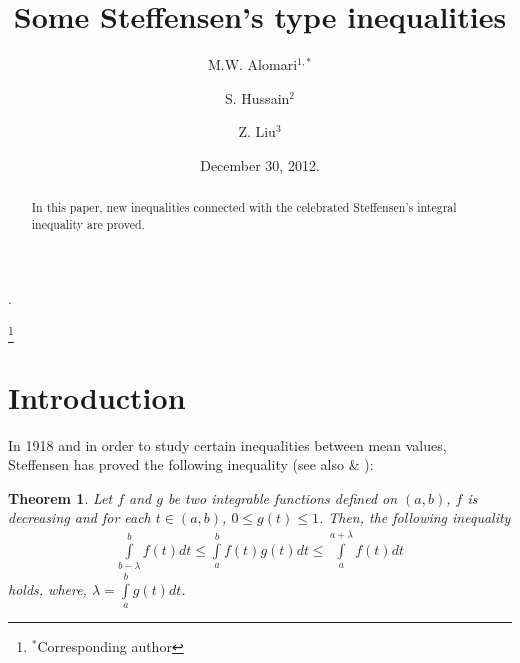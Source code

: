 \documentclass{amsart}
\newtheorem{theorem}{Theorem}
\theoremstyle{plain}
\numberwithin{equation}{section}
\begin{document}
\title[Some Steffensen's type inequalities]{Some Steffensen's type inequalities}



\author[M.W. Alomari]{M.W. Alomari$^{1,*}$}
\address{$^{1}$Department of Mathematics, Faculty of Science and
Information Technology, Irbid National University, 2600 Irbid
21110, Jordan.} 

\author[S. Hussain]{S. Hussain$^2$}
\address{$^2$Department of Mathematics, University of Engineering and  Technology, Lahore, Pakistan}

\author[Z. Liu]{Z. Liu$^{3}$}
\address{$^{3}$Institute of Applied Mathematics, School of Science University of
Science and Technology, Liaoning Anshan 114051, Liaoning, China}.

\thanks{$^*$Corresponding author}

\date{December 30, 2012.}


\begin{abstract}
In this paper, new inequalities connected with the celebrated
Steffensen's integral inequality are proved.
\end{abstract}





\maketitle

\section{Introduction}
In 1918 and in order to study certain inequalities between mean
values, Steffensen \cite{RefN} has proved the following inequality
(see also \cite{RefJ} \& \cite{RefK}):
\begin{theorem}
Let $f$ and $g$ be two integrable functions defined on $(a,b)$,
$f$ is decreasing and for each $t \in (a,b)$, $0 \le g(t) \le 1$.
Then, the following inequality
\begin{eqnarray}
\label{Stef}\int\limits_{b - \lambda }^b {f\left( t \right)dt}
\le \int\limits_a^b {f\left( t \right)g\left( t \right)dt} \le
\int\limits_a^{a + \lambda } {f\left( t \right)dt}
\end{eqnarray}
holds, where, $\lambda  = \int\limits_a^b {g\left( t \right)dt}$.
\end{theorem}
\end{document}
